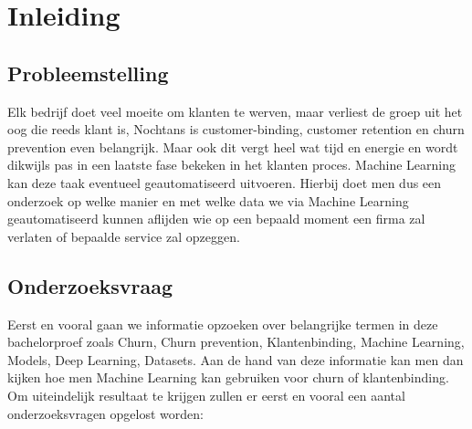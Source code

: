 
\chapter{Inleiding}
\label{ch:inleiding}



\section{Probleemstelling}
\label{sec:probleemstelling en context}
Elk bedrijf doet veel moeite om klanten te werven, maar verliest de groep uit het oog die reeds klant is, Nochtans is customer-binding, customer retention en churn prevention even belangrijk. Maar ook dit vergt heel wat tijd en energie en wordt dikwijls pas in een laatste fase bekeken in het klanten proces. Machine Learning kan deze taak eventueel geautomatiseerd uitvoeren. Hierbij doet men dus een onderzoek op welke manier en met welke data we via Machine Learning geautomatiseerd kunnen aflijden wie op een bepaald moment een firma zal verlaten of bepaalde service zal opzeggen.

\section{Onderzoeksvraag}
\label{sec:Doelstelling en onderzoeksvragen}

Eerst en vooral gaan we informatie opzoeken over belangrijke termen in deze bachelorproef zoals Churn, Churn prevention, Klantenbinding, Machine Learning, Models, Deep Learning, Datasets. Aan de hand van deze informatie kan men dan kijken hoe men Machine Learning kan gebruiken voor churn of klantenbinding. Om uiteindelijk resultaat te krijgen zullen er eerst en vooral een aantal onderzoeksvragen opgelost worden:


